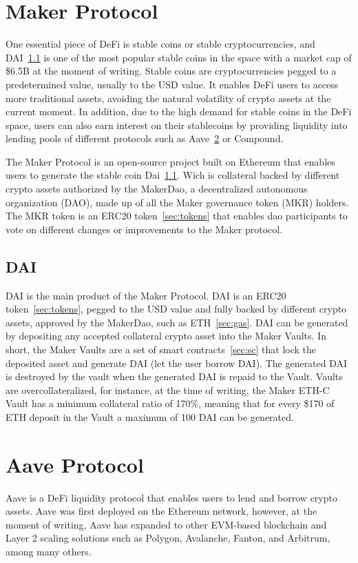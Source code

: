 \documentclass[11pt,a4paper]{report}
\begin{document}
\section{Maker Protocol}\label{sec:maker}
One essential piece of DeFi is stable coins or stable cryptocurrencies, and DAI~\ref{sec:dai}  is one of the most popular stable coins in the space with a market cap of \$6.5B\cite{stablecoinsmarket} at the moment of writing. Stable coins are cryptocurrencies pegged to a predetermined value, usually to the USD value. It enables DeFi users to access more traditional assets, avoiding the natural volatility of crypto assets at the current moment. In addition, due to the high demand for stable coins in the DeFi space, users can also earn interest on their stablecoins by providing liquidity into lending pools of different protocols such as Aave~\ref{sec:aave} or Compound\cite{compound}.

The Maker Protocol\cite{maker} is an open-source project built on Ethereum that enables users to generate the stable coin Dai~\ref{sec:dai}. Wich is collateral backed by different crypto assets authorized by the MakerDao, a decentralized autonomous organization (DAO)\cite{wiki:Dao}, made up of all the Maker governance token (MKR) holders. The MKR token is an ERC20 token~\ref{sec:tokens} that enables dao participants to vote on different changes or improvements to the Maker protocol.
\subsection{DAI}\label{sec:dai}
DAI\cite{makerDAI} is the main product of the Maker Protocol. DAI is an ERC20 token~\ref{sec:tokens},  pegged to the USD value and fully backed by different crypto assets, approved by the MakerDao, such as ETH~\ref{sec:gas}. DAI can be generated by depositing any accepted collateral crypto asset into the Maker Vaults. In short, the Maker Vaults are a set of smart contracts~\ref{sec:sc} that lock the deposited asset and generate DAI (let the user borrow DAI). The generated DAI is destroyed by the vault when the generated DAI is repaid to the Vault. Vaults are overcollateralized, for instance, at the time of writing, the Maker ETH-C Vault has a minimum collateral ratio of 170\%\cite{oasisapp}, meaning that for every \$170 of ETH deposit in the Vault a maximum of 100 DAI can be generated.
\section{Aave Protocol}\label{sec:aave}
Aave\cite{aaveV1}\cite{aaveV2}\cite{aaveV3} is a DeFi liquidity protocol that enables users to lend and borrow crypto assets. Aave was first deployed on the Ethereum network, however, at the moment of writing, Aave has expanded to other EVM-based blockchain and Layer 2 scaling solutions such as  Polygon\cite{polygon}, Avalanche\cite{avax}, Fanton\cite{fanton}, and Arbitrum\cite{arbitrum}, among many others.
\end{document}

